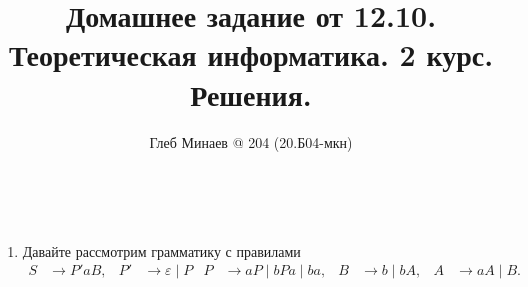 \documentclass[12pt,a4paper]{article}
\title{Домашнее задание от 12.10.\\Теоретическая информатика. 2 курс.\\Решения.}
\author{Глеб Минаев @ 204 (20.Б04-мкн)}
\begin{document}
    \maketitle

    \begin{multicols}{2}
        \tableofcontents
    \end{multicols}

    \begin{problem}{3}\ 
        \begin{enumerate}
            \renewcommand{\labelenumi}{(\theenumi)}
            \renewcommand{\theenumi}{\alph{enumi}}
            \item Давайте рассмотрим грамматику с правилами
                \begin{align*}
                    S &\to P'aB,&
                    P' &\to \varepsilon \mid P&
                    P &\to aP \mid bPa \mid ba,&
                    B &\to b \mid bA,&
                    A &\to aA \mid B.
                \end{align*}


\end{enumerate}
\end{problem}
\end{document}

